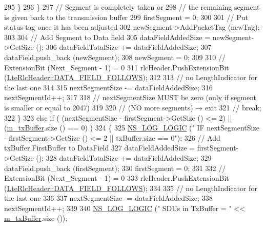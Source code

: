\begin{DoxyCode}
295                 \}
296             \}
297           \textcolor{comment}{// Segment is completely taken or}
298           \textcolor{comment}{// the remaining segment is given back to the transmission buffer}
299           firstSegment = 0;
300 
301           \textcolor{comment}{// Put status tag once it has been adjusted}
302           newSegment->AddPacketTag (newTag);
303 
304           \textcolor{comment}{// Add Segment to Data field}
305           dataFieldAddedSize = newSegment->GetSize ();
306           dataFieldTotalSize += dataFieldAddedSize;
307           dataField.push\_back (newSegment);
308           newSegment = 0;
309 
310           \textcolor{comment}{// ExtensionBit (Next\_Segment - 1) = 0}
311           rlcHeader.PushExtensionBit (\hyperlink{classns3_1_1LteRlcHeader_a48248337dcddd6c1f6f79b75b898266aa244934a97b8fe6ca2786896ca48f04dd}{LteRlcHeader::DATA\_FIELD\_FOLLOWS});
312 
313           \textcolor{comment}{// no LengthIndicator for the last one}
314 
315           nextSegmentSize -= dataFieldAddedSize;
316           nextSegmentId++;
317 
318           \textcolor{comment}{// nextSegmentSize MUST be zero (only if segment is smaller or equal to 2047)}
319 
320           \textcolor{comment}{// (NO more segments) → exit}
321           \textcolor{comment}{// break;}
322         \}
323       \textcolor{keywordflow}{else} \textcolor{keywordflow}{if} ( (nextSegmentSize - firstSegment->GetSize () <= 2) || (\hyperlink{classns3_1_1LteRlcUmLowLat_aaeef0eed7788f26d7564a84a0c546f74}{m\_txBuffer}.size () == 0) )
324         \{
325           \hyperlink{group__logging_ga88acd260151caf2db9c0fc84997f45ce}{NS\_LOG\_LOGIC} (\textcolor{stringliteral}{"    IF nextSegmentSize - firstSegment->GetSize () <= 2 ||
       txBuffer.size == 0"});
326           \textcolor{comment}{// Add txBuffer.FirstBuffer to DataField}
327           dataFieldAddedSize = firstSegment->GetSize ();
328           dataFieldTotalSize += dataFieldAddedSize;
329           dataField.push\_back (firstSegment);
330           firstSegment = 0;
331 
332           \textcolor{comment}{// ExtensionBit (Next\_Segment - 1) = 0}
333           rlcHeader.PushExtensionBit (\hyperlink{classns3_1_1LteRlcHeader_a48248337dcddd6c1f6f79b75b898266aa244934a97b8fe6ca2786896ca48f04dd}{LteRlcHeader::DATA\_FIELD\_FOLLOWS});
334 
335           \textcolor{comment}{// no LengthIndicator for the last one}
336 
337           nextSegmentSize -= dataFieldAddedSize;
338           nextSegmentId++;
339 
340           \hyperlink{group__logging_ga88acd260151caf2db9c0fc84997f45ce}{NS\_LOG\_LOGIC} (\textcolor{stringliteral}{"        SDUs in TxBuffer  = "} << \hyperlink{classns3_1_1LteRlcUmLowLat_aaeef0eed7788f26d7564a84a0c546f74}{m\_txBuffer}.size ());

\end{DoxyCode}
